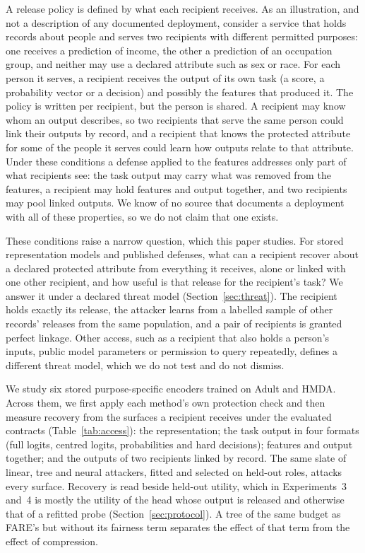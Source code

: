 \documentclass[10pt]{article}
\begin{document}
A release policy is defined by what each recipient receives. As an illustration, and not a description of any
documented deployment, consider a service that holds records about people and serves two recipients with different
permitted purposes: one receives a prediction of income, the other a prediction of an occupation group, and neither may
use a declared attribute such as sex or race. For each person it serves, a recipient receives the output of its own task
(a score, a probability vector or a decision) and possibly the features that produced it. The policy is written per
recipient, but the person is shared. A recipient may know whom an output describes, so two recipients that serve the
same person could link their outputs by record, and a recipient that knows the protected attribute for some of the
people it serves could learn how outputs relate to that attribute. Under these conditions a defense applied to the
features addresses only part of what recipients see: the task output may carry what was removed from the features, a
recipient may hold features and output together, and two recipients may pool linked outputs. We know of no source that
documents a deployment with all of these properties, so we do not claim that one exists.

These conditions raise a narrow question, which this paper studies. For stored representation models and published
defenses, what can a recipient recover about a declared protected attribute from everything it receives, alone or
linked with one other recipient, and how useful is that release for the recipient's task? We answer it under a declared
threat model (Section~\ref{sec:threat}). The recipient holds exactly its release, the attacker learns from a labelled
sample of other records' releases from the same population, and a pair of recipients is granted perfect linkage. Other
access, such as a recipient that also holds a person's inputs, public model parameters or permission to query
repeatedly, defines a different threat model, which we do not test and do not dismiss.

We study six stored purpose-specific encoders trained on Adult and HMDA. Across them, we first apply each method's own protection check and then measure recovery from the surfaces a
recipient receives under the evaluated contracts (Table~\ref{tab:access}): the
representation; the task output in four formats (full logits, centred logits, probabilities and hard decisions);
features and output together; and the outputs of two recipients linked by record. The same slate of linear, tree and
neural attackers, fitted and selected on held-out roles, attacks every surface. Recovery is read beside held-out
utility, which in Experiments~3 and~4 is mostly the utility of the head whose output is released and otherwise that of a
refitted probe (Section~\ref{sec:protocol}). A tree of the same budget as FARE's but without its fairness term
separates the effect of that term from the effect of compression.
\end{document}
